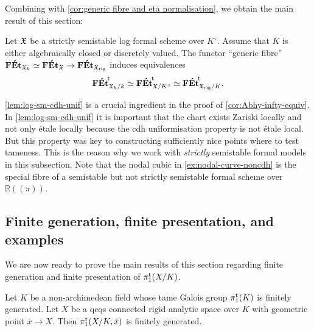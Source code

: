 Combining with \cref{cor:generic fibre and eta normalisation}, we obtain the main result of this section:

\begin{cor} \label{cor:Abhy-infty-equiv}
    Let ${\mathfrak{X}}$ be a strictly semistable log formal scheme over $K^\circ$. Assume that $K$ is either algebraically closed or discretely valued. 
    The functor ``generic fibre'' 
    $\mathbf{F\acute{E}t}_{{\mathfrak{X}}_k}\simeq \mathbf{F\acute{E}t}_{\mathfrak{X}}\to \mathbf{F\acute{E}t}_{{\mathfrak{X}}_{\rm rig}}$ induces equivalences
    \[
        {\mathbf{F\acute{E}t}}^{\!\mathrm{t}}_{{\mathfrak{X}}_k/k} \simeq {\mathbf{F\acute{E}t}}^{\!\mathrm{t}}_{{\mathfrak{X}}/K^\circ} \simeq {\mathbf{F\acute{E}t}}^{\!\mathrm{t}}_{{\mathfrak{X}}_{\rm rig}/K}.
    \]
\end{cor}

\cref{lem:log-sm-cdh-unif} is a crucial ingredient in the proof of \cref{cor:Abhy-infty-equiv}. In \cref{lem:log-sm-cdh-unif} it is important that the chart exists Zariski locally and not only étale locally because the cdh uniformisation property is not étale local.
But this property was key to constructing sufficiently nice points where to test tameness.
This is the reason why we work with \emph{strictly} semistable formal models in this subsection. Note that the nodal cubic in \cref{ex:nodal-curve-noncdh} is the special fibre of a semistable but not strictly semistable formal scheme over $\mathbb{R}(\!(\pi)\!)$.

\subsection{Finite generation, finite presentation, and examples}
\label{ss:tamepi1-rig-fgfp}

We are now ready to prove the main results of this section regarding finite generation and finite presentation of $\pi_1^{\mathrm{t}}(X/K)$. 

\begin{thm} \label{thm:fg-pi1-rig}
    Let $K$ be a non-archimedean field whose tame Galois group $\pi_1^{\mathrm{t}}(K)$ is finitely generated. Let $X$ be a qcqs connected rigid analytic space over $K$ with geometric point $\bar x\to X$. 
    Then $\pi_1^{\mathrm{t}}(X/K,\bar x)$ is finitely generated.
\end{thm}

